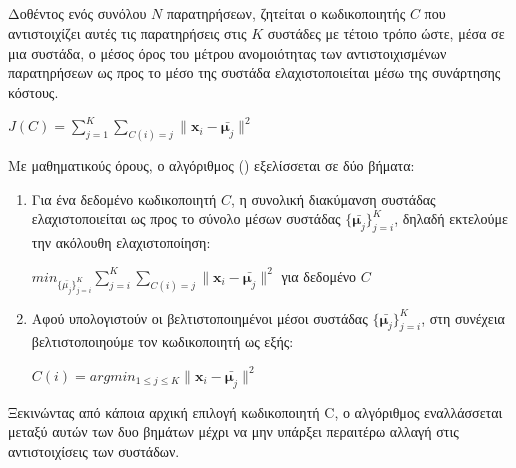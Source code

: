 \subsection{}
\label{doc:kmeans}
Δοθέντος ενός συνόλου $N$ παρατηρήσεων, ζητείται ο κωδικοποιητής $C$ που αντιστοιχίζει αυτές τις παρατηρήσεις στις $K$ συστάδες με τέτοιο τρόπο ώστε, μέσα σε μια συστάδα, ο μέσος όρος του μέτρου ανομοιότητας των αντιστοιχισμένων παρατηρήσεων ως προς το μέσο της συστάδα ελαχιστοποιείται μέσω της συνάρτησης κόστους.
\begin{center}
$J(C)= \sum_{j=1}^K \sum_{C(i)=j}\|\mathbf{x}_i-\bar{\mathbf{\mu}_j}\|^2$
\end{center}
Με μαθηματικούς όρους, ο αλγόριθμος () εξελίσσεται σε δύο βήματα:
\begin{enumerate}
\item Για ένα δεδομένο κωδικοποιητή $C$, η συνολική διακύμανση συστάδας ελαχιστοποιείται ως προς το σύνολο μέσων συστάδας $\{\bar{\mathbf{\mu}_j}\}_{j=i}^K$, δηλαδή εκτελούμε την ακόλουθη ελαχιστοποίηση:
\begin{center}
$ min_{\{\bar{\mu_j}\}_{j=i}^K} \sum_{j=i}^K \sum_{C(i)=j} \|\mathbf{x}_i-\bar{\mathbf{\mu}_j}\|^2$ για δεδομένο $C$
\end{center}
\item Αφού υπολογιστούν οι βελτιστοποιημένοι μέσοι συστάδας $\{\bar{\mathbf{\mu}_j}\}_{j=i}^K$, στη συνέχεια βελτιστοποιηούμε τον κωδικοποιητή ως εξής:
\begin{center}
$C(i) = arg min_{1 \leq j \leq K} \|\mathbf{x}_i-\bar{\mathbf{\mu}_j}\|^2$
\end{center}
\end{enumerate}
Ξεκινώντας από κάποια αρχική επιλογή κωδικοποιητή C, ο αλγόριθμος εναλλάσσεται μεταξύ αυτών των δυο βημάτων μέχρι να μην υπάρξει περαιτέρω αλλαγή στις αντιστοιχίσεις των συστάδων\cite{haykin}.
